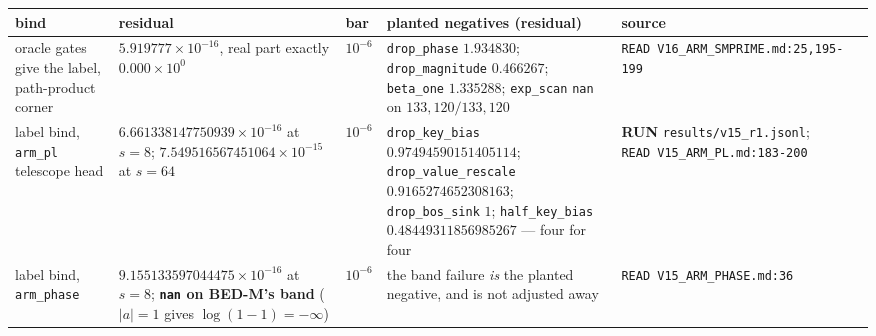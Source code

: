\documentclass[11pt,a4paper]{article}
\newcounter{none}                 %
\theoremstyle{plain}
\theoremstyle{definition}
\theoremstyle{remark}
\begin{document}
{\def\LTcaptype{none} %
\begin{longtable}[]{@{}
  >{\raggedright\arraybackslash}p{}
  >{\raggedright\arraybackslash}p{}
  >{\raggedright\arraybackslash}p{}
  >{\raggedright\arraybackslash}p{}
  >{\raggedright\arraybackslash}p{}@{}}
\toprule\noalign{}
\begin{minipage}[b]{\linewidth}\raggedright
bind
\end{minipage} & \begin{minipage}[b]{\linewidth}\raggedright
residual
\end{minipage} & \begin{minipage}[b]{\linewidth}\raggedright
bar
\end{minipage} & \begin{minipage}[b]{\linewidth}\raggedright
planted negatives (residual)
\end{minipage} & \begin{minipage}[b]{\linewidth}\raggedright
source
\end{minipage} \\
\midrule\noalign{}
\endhead
\bottomrule\noalign{}
\endlastfoot
oracle gates give the label, path-product corner &
\(5.919777\times10^{-16}\), real part exactly \(0.000\times10^{0}\) &
\(10^{-6}\) & \texttt{drop\_phase} \(1.934830\);
\texttt{drop\_magnitude} \(0.466267\); \texttt{beta\_one} \(1.335288\);
\texttt{exp\_scan} \texttt{nan} on \(133{,}120/133{,}120\) &
\texttt{READ\ V16\_ARM\_SMPRIME.md:25,195-199} \\
label bind, \texttt{arm\_pl} telescope head &
\(6.661338147750939\times10^{-16}\) at \(s=8\);
\(7.549516567451064\times10^{-15}\) at \(s=64\) & \(10^{-6}\) &
\texttt{drop\_key\_bias} \(0.97494590151405114\);
\texttt{drop\_value\_rescale} \(0.9165274652308163\);
\texttt{drop\_bos\_sink} \(1\); \texttt{half\_key\_bias}
\(0.48449311856985267\) --- four for four & \textbf{RUN}
\texttt{results/v15\_r1.jsonl};
\texttt{READ\ V15\_ARM\_PL.md:183-200} \\
label bind, \texttt{arm\_phase} & \(9.155133597044475\times10^{-16}\) at
\(s=8\); \textbf{\texttt{nan} on BED-M's band} (\(\lvert a\rvert=1\)
gives \(\log(1-1)=-\infty\)) & \(10^{-6}\) & the band failure \emph{is}
the planted negative, and is not adjusted away &
\texttt{READ\ V15\_ARM\_PHASE.md:36} \\

\end{longtable}}
\end{document}
